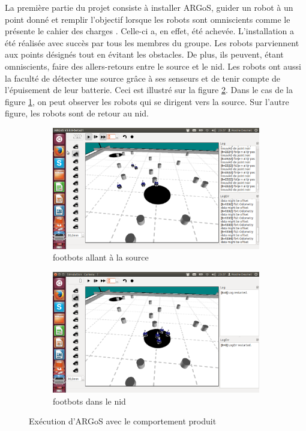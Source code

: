 La première partie du projet consiste à installer ARGoS, guider un robot à un point donné et remplir l'objectif lorsque les robots sont omniscients comme le présente le cahier des charges \cite{cahierCharges}. Celle-ci a, en effet, été achevée. L'installation a été réalisée avec succès par tous les membres du groupe. Les robots parviennent aux points désignés tout en évitant les obstacles. De plus, ils peuvent, étant omniscients, faire des allers-retours entre le source et le nid. Les robots ont aussi la faculté de détecter une source grâce à ses senseurs et de tenir compte de l'épuisement de leur batterie. Ceci est illustré sur la figure \ref{fig:ourArgos}. Dans le cas de la figure \ref{fig:argosNest}, on  peut observer les robots qui se dirigent vers la source. Sur l'autre figure, les robots sont  de retour au nid.

\begin{figure}[h!]
        \centering
        \begin{subfigure}[h!]{0.4\textwidth}
                \includegraphics[trim = 60mm 40mm 75mm 45mm, clip, width=\textwidth]{pics/ourArgos1.png}
                \caption{footbots allant à la source}
        \end{subfigure}   \begin{subfigure}[h!]{0.4\textwidth}
                \includegraphics[trim = 60mm 40mm 75mm 45mm, clip, width=\textwidth]{pics/ourArgos2.png}
                \caption{footbots dans le nid\label{fig:argosNest}}
        \end{subfigure}
        \caption{Exécution d'ARGoS avec le comportement produit\label{fig:ourArgos}}
\end{figure}

